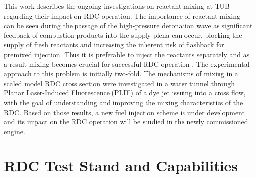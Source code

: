 \documentclass[]{aiaa-tc}%
\begin{document}

This work describes the ongoing investigations on reactant mixing at TUB regarding their impact on RDC operation. The importance of reactant mixing can be seen during the passage of the high-pressure detonation wave as significant feedback of combustion products into the supply plena can occur, blocking the supply of fresh reactants and increasing the inherent risk of flashback for premixed injection. Thus it is preferable to inject the reactants separately and as a result mixing becomes crucial for successful RDC operation \cite{Nordeen2015, Driscoll2016}. The experimental approach to this problem is initially two-fold. The mechanisms of mixing in a scaled model RDC cross section were investigated in a water tunnel through Planar Laser-Induced Fluorescence (PLIF) of a dye jet issuing into a cross flow, with the goal of understanding and improving the mixing characteristics of the RDC. Based on those results, a new fuel injection scheme is under development and its impact on the RDC operation will be studied in the newly commissioned engine. 



\section{RDC Test Stand and Capabilities}
\end{document}
